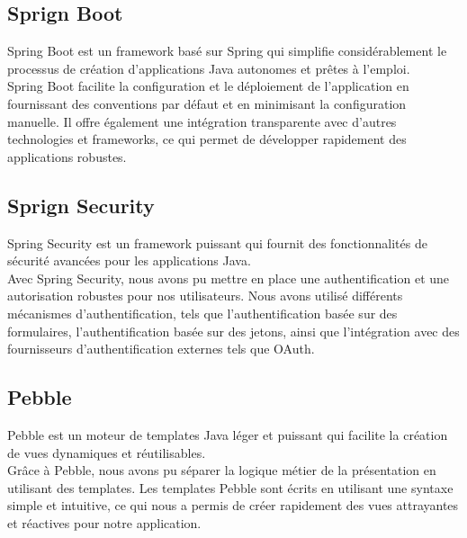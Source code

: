 \subsection*{Sprign Boot}
Spring Boot est un framework basé sur Spring qui simplifie considérablement le processus de création d'applications Java autonomes et prêtes à l'emploi.\\

Spring Boot facilite la configuration et le déploiement de l'application en fournissant des conventions par défaut et en minimisant la configuration manuelle. Il offre également une intégration transparente avec d'autres technologies et frameworks, ce qui permet de développer rapidement des applications robustes.

\subsection*{Sprign Security}
Spring Security est un framework puissant qui fournit des fonctionnalités de sécurité avancées pour les applications Java.\\

Avec Spring Security, nous avons pu mettre en place une authentification et une autorisation robustes pour nos utilisateurs. Nous avons utilisé différents mécanismes d'authentification, tels que l'authentification basée sur des formulaires, l'authentification basée sur des jetons, ainsi que l'intégration avec des fournisseurs d'authentification externes tels que OAuth.


\subsection*{Pebble}
Pebble est un moteur de templates Java léger et puissant qui facilite la création de vues dynamiques et réutilisables.\\

Grâce à Pebble, nous avons pu séparer la logique métier de la présentation en utilisant des templates. Les templates Pebble sont écrits en utilisant une syntaxe simple et intuitive, ce qui nous a permis de créer rapidement des vues attrayantes et réactives pour notre application.

